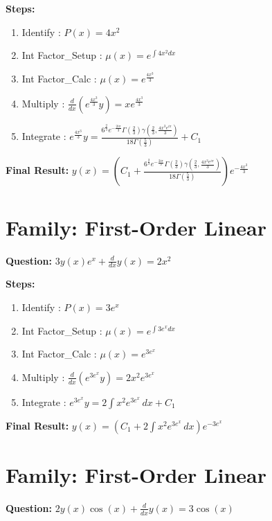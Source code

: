 \documentclass{article}
\begin{document}
\textbf{Steps:}
\begin{enumerate}
\item Identify :  $P(x) = 4 x^{2}$
\item Int Factor_Setup :  $\mu(x) = e^{\int 4 x^{2} dx}$
\item Int Factor_Calc :  $\mu(x) = e^{\frac{4 x^{3}}{3}}$
\item Multiply :  $\frac{d}{dx}(e^{\frac{4 x^{3}}{3}}y) = x e^{\frac{4 x^{3}}{3}}$
\item Integrate :  $e^{\frac{4 x^{3}}{3}}y = \frac{6^{\frac{2}{3}} e^{- \frac{2 i \pi}{3}} \Gamma\left(\frac{2}{3}\right) \gamma\left(\frac{2}{3}, \frac{4 x^{3} e^{i \pi}}{3}\right)}{18 \Gamma\left(\frac{5}{3}\right)} + C_1$
\end{enumerate}
\textbf{Final Result:} $y{\left(x \right)} = \left(C_{1} + \frac{6^{\frac{2}{3}} e^{- \frac{2 i \pi}{3}} \Gamma\left(\frac{2}{3}\right) \gamma\left(\frac{2}{3}, \frac{4 x^{3} e^{i \pi}}{3}\right)}{18 \Gamma\left(\frac{5}{3}\right)}\right) e^{- \frac{4 x^{3}}{3}}$

\section*{Family: First-Order Linear}
\textbf{Question:} $3 y{\left(x \right)} e^{x} + \frac{d}{d x} y{\left(x \right)} = 2 x^{2}$

\textbf{Steps:}
\begin{enumerate}
\item Identify :  $P(x) = 3 e^{x}$
\item Int Factor_Setup :  $\mu(x) = e^{\int 3 e^{x} dx}$
\item Int Factor_Calc :  $\mu(x) = e^{3 e^{x}}$
\item Multiply :  $\frac{d}{dx}(e^{3 e^{x}}y) = 2 x^{2} e^{3 e^{x}}$
\item Integrate :  $e^{3 e^{x}}y = 2 \int x^{2} e^{3 e^{x}}\, dx + C_1$
\end{enumerate}
\textbf{Final Result:} $y{\left(x \right)} = \left(C_{1} + 2 \int x^{2} e^{3 e^{x}}\, dx\right) e^{- 3 e^{x}}$

\section*{Family: First-Order Linear}
\textbf{Question:} $2 y{\left(x \right)} \cos{\left(x \right)} + \frac{d}{d x} y{\left(x \right)} = 3 \cos{\left(x \right)}$
\end{document}
